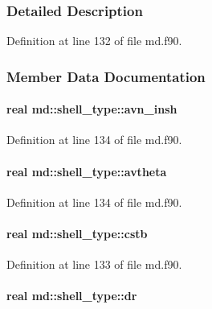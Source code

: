 \subsubsection{Detailed Description}


Definition at line 132 of file md.\-f90.



\subsubsection{Member Data Documentation}
\hypertarget{structmd_1_1shell__type_a72fa2cb5fb77254f7937e3c63edb686b}{
\paragraph[{avn\-\_\-insh}]{\setlength{\rightskip}{0pt plus 5cm}real md\-::shell\-\_\-type\-::avn\-\_\-insh}}\label{structmd_1_1shell__type_a72fa2cb5fb77254f7937e3c63edb686b}


Definition at line 134 of file md.\-f90.

\hypertarget{structmd_1_1shell__type_a235f1c472b401050d501343c1657f4bf}{
\paragraph[{avtheta}]{\setlength{\rightskip}{0pt plus 5cm}real md\-::shell\-\_\-type\-::avtheta}}\label{structmd_1_1shell__type_a235f1c472b401050d501343c1657f4bf}


Definition at line 134 of file md.\-f90.

\hypertarget{structmd_1_1shell__type_a09366e8ec0ac3346eddeabbcab3136fe}{
\paragraph[{cstb}]{\setlength{\rightskip}{0pt plus 5cm}real md\-::shell\-\_\-type\-::cstb}}\label{structmd_1_1shell__type_a09366e8ec0ac3346eddeabbcab3136fe}


Definition at line 133 of file md.\-f90.

\hypertarget{structmd_1_1shell__type_a6ab5044b26cea9283af4704e9ab4b6f2}{
\paragraph[{dr}]{\setlength{\rightskip}{0pt plus 5cm}real md\-::shell\-\_\-type\-::dr}}\label{structmd_1_1shell__type_a6ab5044b26cea9283af4704e9ab4b6f2}


